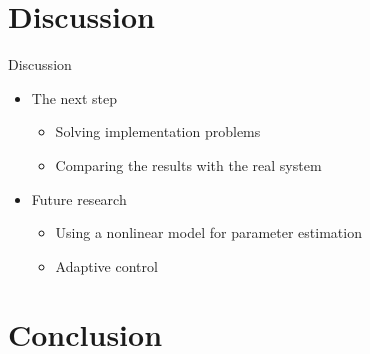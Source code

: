 \section{Discussion}


\begin{frame}{Discussion}{}

\begin{itemize}
	\item<1->The next step
	\begin{itemize}
	 \item<1-> Solving implementation problems  
	 \item<1-> Comparing the results with the real system
	\end{itemize}
\end{itemize}

\begin{itemize}
\item<2-> Future research
	 \begin{itemize}
	 \item<2-> Using a nonlinear model for parameter estimation 
	 \item<2-> Adaptive control
	 \end{itemize}
\end{itemize}

\end{frame}


\section{Conclusion}


